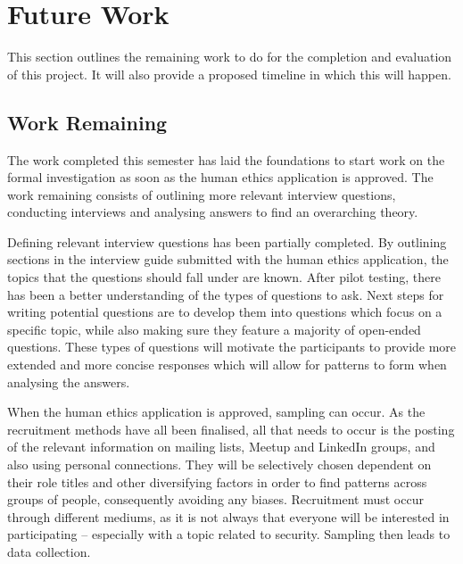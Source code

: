 \chapter{Future Work}\label{C:future}

\par This section outlines the remaining work to do for the completion and evaluation of this project. It will also provide a proposed timeline in which this will happen. 

\section{Work Remaining}

\par The work completed this semester has laid the foundations to start work on the formal investigation as soon as the human ethics application is approved. The work remaining consists of outlining more relevant interview questions, conducting interviews and analysing answers to find an overarching theory.
\newline
\par Defining relevant interview questions has been partially completed. By outlining sections in the interview guide submitted with the human ethics application, the topics that the questions should fall under are known. After pilot testing, there has been a better understanding of the types of questions to ask. Next steps for writing potential questions are to develop them into questions which focus on a specific topic, while also making sure they feature a majority of open-ended questions. These types of questions will motivate the participants to provide more extended and more concise responses which will allow for patterns to form when analysing the answers.
\newline
\par When the human ethics application is approved, sampling can occur. As the recruitment methods have all been finalised, all that needs to occur is the posting of the relevant information on mailing lists, Meetup and LinkedIn groups, and also using personal connections. They will be selectively chosen dependent on their role titles and other diversifying factors in order to find patterns across groups of people, consequently avoiding any biases. Recruitment must occur through different mediums, as it is not always that everyone will be interested in participating – especially with a topic related to security.  Sampling then leads to data collection.
\newline
